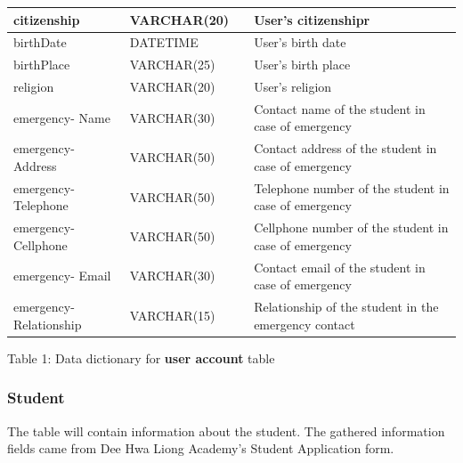 \documentclass[11pt,a4paper,titlepage]{article}
\begin{document}
\begin{longtable}{ |p{2.5cm}|p{4.5cm}|p{2.5cm}|p{3cm}|  }
    citizenship & VARCHAR(20) & & User's citizenshipr \\ \hline
    birthDate & DATETIME & & User's birth date \\ \hline
    birthPlace & VARCHAR(25) & & User's birth place \\ \hline
    religion & VARCHAR(20) & & User's religion \\ \hline
    emergency- Name & VARCHAR(30) & & Contact name of the student in case of emergency \\ \hline
    emergency- Address & VARCHAR(50) & & Contact address of the student in case of emergency \\ \hline
    emergency- Telephone & VARCHAR(50) & & Telephone number of the student in case of emergency \\ \hline
    emergency- Cellphone & VARCHAR(50) & & Cellphone number of the student in case of emergency \\ \hline
    emergency- Email & VARCHAR(30) & & Contact email of the student in case of emergency \\ \hline
    emergency- Relationship & VARCHAR(15) & & Relationship of the student in the emergency contact \\ \hline
\end{longtable}

\vspace{1cm}
\begin{center}
Table 1: Data dictionary for \textbf{user account} table
\end{center}
\subsubsection{Student}

The table will contain information about the student. The gathered information fields came from Dee Hwa Liong Academy's Student Application form.
\end{document}
